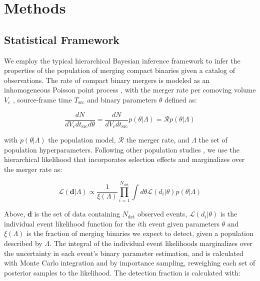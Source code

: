 \section{Methods} \label{sec:methods}

\subsection{Statistical Framework} \label{sec:statistical_framework}

We employ the typical hierarchical Bayesian inference framework to infer the properties of the population of merging compact binaries given a catalog of observations. The rate of compact binary mergers is modeled as an inhomogeneous Poisson point process \citep{10.1093/mnras/stz896}, with the merger rate per comoving volume $V_c$ \citep{astro-ph/9905116}, source-frame time $T_\text{src}$ and binary parameters $\theta$ defined as: 

\begin{equation} \label{eq:rate}
    \frac{dN}{dV_cdt_\mathrm{src}d\theta} = \frac{dN}{dV_cdt_\mathrm{src}} p(\theta | \Lambda) = \mathcal{R} p(\theta | \Lambda)
\end{equation}

\noindent with $p(\theta | \Lambda)$ the population model, $\mathcal{R}$ the merger rate, and $\Lambda$ the set of population hyperparameters. Following other population studies \citep{10.1093/mnras/stz896,2007.05579,2010.14533,2111.03634}, we use the hierarchical likelihood that incorporates selection effects and marginalizes over the merger rate as: 

\begin{equation} \label{eq:likelihood}
    \mathcal{L}(\bm{d} | \Lambda) \propto \frac{1}{\xi(\Lambda)} \prod_{i=1}^{N_\mathrm{det}} \int d\theta \mathcal{L}(d_i | \theta) p(\theta | \Lambda)
\end{equation}

\noindent Above, $\bm{d}$ is the set of data containing $N_\mathrm{det}$ observed events, $\mathcal{L}(d_i | \theta)$ is the individual event likelihood function for the $i$th event given parameters $\theta$ and $\xi(\Lambda)$ is the fraction of merging binaries we expect to detect, given a population described by $\Lambda$. The integral of the individual event likelihoods marginalizes over the uncertainty in each event's binary parameter estimation, and is calculated with Monte Carlo integration and by importance sampling, reweighing each set of posterior samples to the likelihood. The detection fraction is calculated with:


